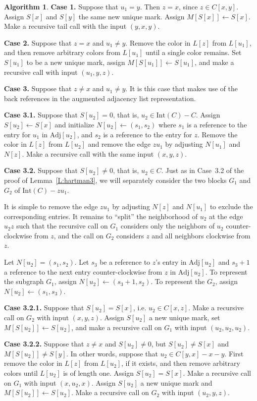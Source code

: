 \documentclass[12pt,letterpaper]{article}
\theoremstyle{plain}
\theoremstyle{definition}
\theoremstyle{break}
\newtheorem{algorithm}[lemma]{Algorithm}     %
\begin{document}
\begin{algorithm}
\textbf{Case 1.} Suppose that $u_1=y$. Then $z=x$, since $z\in C[x,y]$. Assign
$S[x]$ and $S[y]$ the same new unique mark. Assign $M[S[x]]\leftarrow S[x]$.
Make a recursive tail call with the input $(y, x, y)$.

\textbf{Case 2.} Suppose that $z=x$ and $u_1\ne y$. 
Remove the color in $L[z]$ from $L[u_1]$, and then remove arbitrary
colors from $L[u_1]$ until a single color remains.
Set $S[u_1]$ to be a new unique mark, assign $M[S[u_1]]\leftarrow S[u_1]$,
and make a recursive call with input $(u_1, y, z)$.

\textbf{Case 3.} Suppose that $z\ne x$ and $u_1\ne y$. It is this case that
makes use of the back references in the augmented adjacency list representation.

\textbf{Case 3.1.} Suppose that $S[u_2]=0$, that is, $u_2\in
\text{Int}(C)-C$. Assign $S[u_2]\leftarrow S[x]$ and initialize
$N[u_2]\leftarrow(s_1,s_2)$ where $s_1$ is a reference to the entry
for $u_1$ in $\text{Adj}[u_2]$, and $s_2$ is a reference to the entry
for $z$. Remove the color in $L[z]$ from
$L[u_2]$ and remove the edge $zu_1$ by adjusting
$N[u_1]$ and $N[z]$. Make a recursive call with the same input $(x, y, z)$.

\textbf{Case 3.2.} Suppose that $S[u_2]\ne 0$, that is, $u_2\in C$. Just as in
Case~3.2 of the proof of Lemma~\ref{L:hartman3}, we will separately consider
the two blocks $G_1$ and $G_2$ of $\text{Int}(C)-zu_1$.

It is simple to remove the edge $zu_1$ by adjusting $N[z]$ and $N[u_1]$ to
exclude
the corresponding entries. It remains
to ``split'' the
neighborhood of $u_2$ at the edge $u_2z$ such that the recursive call on $G_1$
considers only the neighbors of $u_2$ counter-clockwise from $z$, and the call
on $G_2$ considers $z$ and all neighbors clockwise from $z$.

Let $N[u_2]=(s_1,s_2)$. Let $s_3$ be a reference to $z$'s entry in
$\text{Adj}[u_2]$ and
$s_3+1$ a reference to the next entry counter-clockwise from $z$ in
$\text{Adj}[u_2]$.
To represent
the subgraph $G_1$, assign
$N[u_2]\leftarrow (s_3+1,s_2)$. To represent the $G_2$,
assign $N[u_2]\leftarrow (s_1,s_3)$.

\textbf{Case 3.2.1.} Suppose that $S[u_2]=S[x]$, i.e. $u_2\in C[x,z]$. Make a
recursive call on $G_2$ with input $(x, y, z)$. Assign
$S[u_2]$ a new
unique mark, set $M[S[u_2]]\leftarrow S[u_2]$, and make a recursive call
on $G_1$ with input $(u_2, u_2, u_2)$.

\textbf{Case 3.2.2.} Suppose that $z\ne x$ and $S[u_2]\ne 0$, but
$S[u_2]\ne S[x]$ and $M[S[u_2]]\ne S[y]$. In other words, suppose that
$u_2\in C[y,x]-x-y$.
First remove the color in $L[z]$ from $L[u_2]$, if it exists, and then remove
arbitrary colors until $L[u_2]$ is of length one. Assign $S[u_2]=S[x]$.
Make a recursive call on $G_1$ with input $(x, u_2, x)$.
Assign $S[u_2]$ a new unique mark and $M[S[u_2]]\leftarrow S[u_2]$.
Make a recursive call on $G_2$ with input $(u_2, y, z)$.


\end{algorithm}
\end{document}
